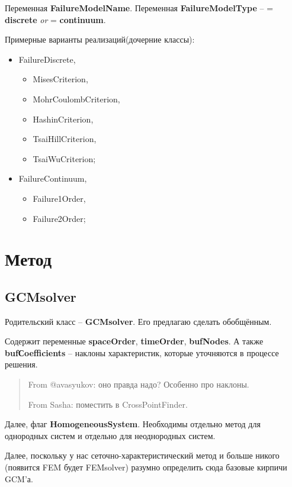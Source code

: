 \documentclass[a4paper,12pt]{article}
\numberwithin{equation}{section}
\begin{document}
	Переменная \textbf{FailureModelName}.
	Переменная \textbf{FailureModelType} -- = \textbf{discrete} \textit{or} = \textbf{continuum}.
	
	Примерные варианты реализаций(дочерние классы):
	\begin{itemize}
		\item{FailureDiscrete,}
		\begin{itemize}
			\item{MisesCriterion,}
			\item{MohrCoulombCriterion,}
			\item{HashinCriterion,}
			\item{TsaiHillCriterion,}
			\item{TsaiWuCriterion;}
		\end{itemize}
		\item{FailureContinuum,}
		\begin{itemize}
			\item{Failure1Order,}
			\item{Failure2Order;}
		\end{itemize}
	\end{itemize}
	
\section{Метод}
\subsection{GCMsolver}
	Родительский класс -- \textbf{GCMsolver}. Его предлагаю сделать обобщённым.
	
	Содержит переменные \textbf{spaceOrder}, \textbf{timeOrder}, \textbf{bufNodes}.
	А также \textbf{bufСoefficients} -- наклоны характеристик, которые уточняются в процессе решения.

\blockquote{
From @avasyukov: оно правда надо? Особенно про наклоны.

From Sasha: поместить в CrossPointFinder.
}
	
	Далее, флаг \textbf{HomogeneousSystem}. Необходимы отдельно метод для однородных систем и отдельно для неоднородных систем.
	
	Далее, поскольку у нас сеточно-характеристический метод и больше никого (появится FEM будет FEMsolver) разумно определить сюда базовые кирпичи GCM'а.
	
\end{document}
